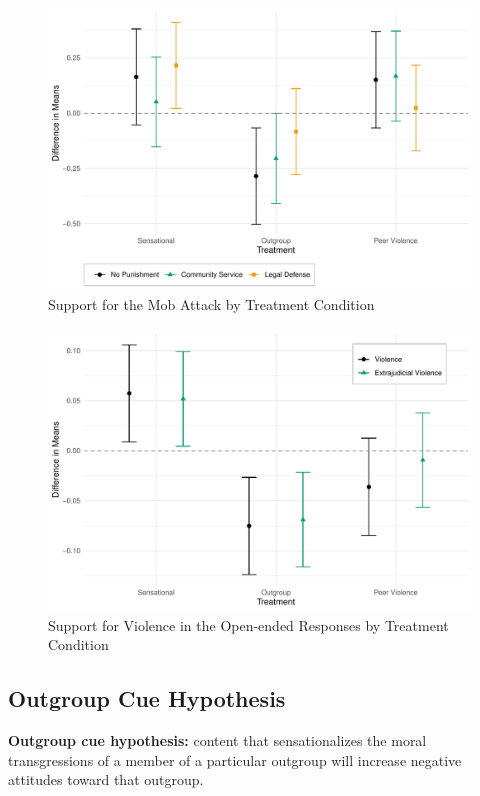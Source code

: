 \begin{figure}[!htbp]
  \centering
  \caption{Support for the Mob Attack by Treatment Condition}
  \includegraphics[width=.835\textwidth]{figures/ATE_punish_mob_outcomes.pdf}
\end{figure}

\begin{figure}[!htbp]
  \centering
  \caption{Support for Violence in the Open-ended Responses by Treatment Condition}
  \includegraphics[width=.835\textwidth]{figures/ATE_oe.pdf}
\end{figure}

\subsection{Outgroup Cue Hypothesis}

\vspace{1em}
\noindent\textbf{Outgroup cue hypothesis:}  content that sensationalizes the moral transgressions of a member of a particular outgroup will increase negative attitudes toward that outgroup.
\vspace{1em}

